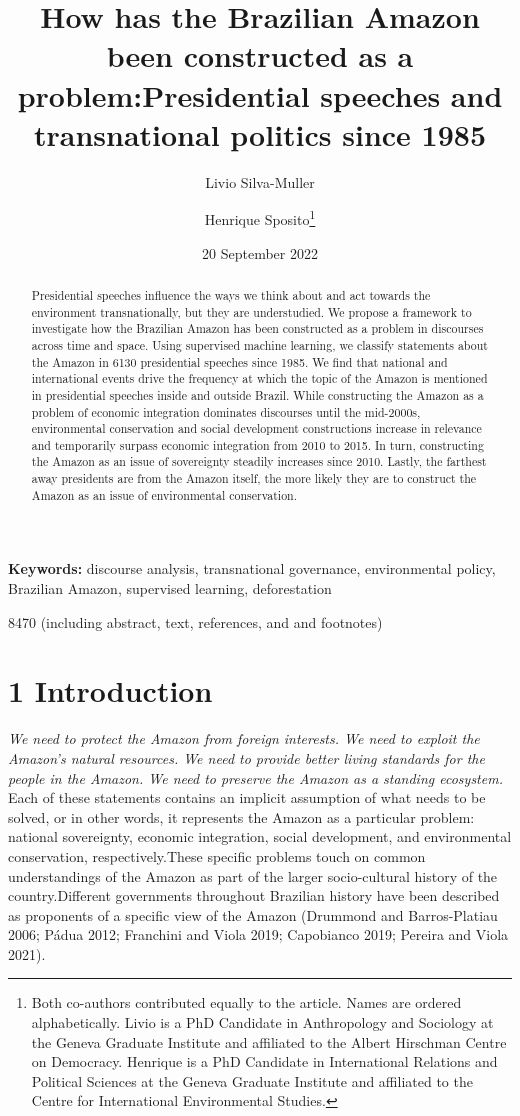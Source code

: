 \documentclass[
  12pt,
]{article}
\title{How has the Brazilian Amazon been constructed as a
problem:Presidential speeches and transnational politics since 1985}
\author{Livio Silva-Muller \and Henrique Sposito\footnote{Both
  co-authors contributed equally to the article. Names are ordered
  alphabetically. Livio is a PhD Candidate in Anthropology and Sociology
  at the Geneva Graduate Institute and affiliated to the Albert
  Hirschman Centre on Democracy. Henrique is a PhD Candidate in
  International Relations and Political Sciences at the Geneva Graduate
  Institute and affiliated to the Centre for International Environmental
  Studies.}}
\date{20 September 2022}
\providecommand{\keywords}[1]{\textbf{Keywords:} #1}
\providecommand{\wordcount}[1]{\text{Word Count:}#1}
\begin{document}
\maketitle
\begin{abstract}
Presidential speeches influence the ways we think about and act towards
the environment transnationally, but they are understudied. We propose a
framework to investigate how the Brazilian Amazon has been constructed
as a problem in discourses across time and space. Using supervised
machine learning, we classify statements about the Amazon in 6130
presidential speeches since 1985. We find that national and
international events drive the frequency at which the topic of the
Amazon is mentioned in presidential speeches inside and outside Brazil.
While constructing the Amazon as a problem of economic integration
dominates discourses until the mid-2000s, environmental conservation and
social development constructions increase in relevance and temporarily
surpass economic integration from 2010 to 2015. In turn, constructing
the Amazon as an issue of sovereignty steadily increases since 2010.
Lastly, the farthest away presidents are from the Amazon itself, the
more likely they are to construct the Amazon as an issue of
environmental conservation.
\end{abstract}

\keywords{ discourse analysis, transnational governance, environmental policy, Brazilian Amazon, supervised learning, deforestation}

\wordcount{ 8470 (including abstract, text, references, and and footnotes)}

\pagebreak

\hypertarget{introduction}{%
\section{1 Introduction}\label{introduction}}

\emph{We need to protect the Amazon from foreign interests. We need to
exploit the Amazon's natural resources. We need to provide better living
standards for the people in the Amazon. We need to preserve the Amazon
as a standing ecosystem.} Each of these statements contains an implicit
assumption of what needs to be solved, or in other words, it represents
the Amazon as a particular problem: national sovereignty, economic
integration, social development, and environmental conservation,
respectively.These specific problems touch on common understandings of
the Amazon as part of the larger socio-cultural history of the
country.Different governments throughout Brazilian history have been
described as proponents of a specific view of the Amazon (Drummond and
Barros-Platiau 2006; Pádua 2012; Franchini and Viola 2019; Capobianco
2019; Pereira and Viola 2021).
\end{document}
